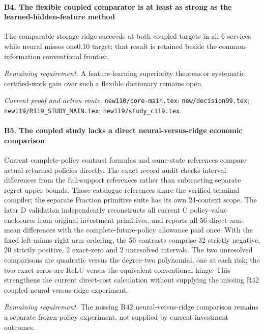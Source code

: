 \paragraph{B4. The flexible coupled comparator is at least as strong as the learned-hidden-feature method}

The comparable-storage ridge succeeds at both coupled targets in all 6 services while neural misses one0.10 target; that result is retained beside the common-information conventional frontier.

\par\emph{Remaining requirement.} A feature-learning superiority theorem or systematic certified-work gain over such a flexible dictionary remains open.

\par\emph{Current proof and action route.} \nolinkurl{new110/core-main.tex}; \nolinkurl{new/decision99.tex}; \nolinkurl{new119/R119_STUDY_MAIN.tex}; \nolinkurl{new119/study_c119.tex}.

\paragraph{B5. The coupled study lacks a direct neural-versus-ridge economic comparison}

Current complete-policy contrast formulas and same-state references compare actual returned policies directly. The exact record audit checks interval differences from the full-support references rather than subtracting separate regret upper bounds. Those catalogue references share the verified terminal compiler; the separate Fraction primitive suite has its own 24-context scope. The later D validation independently reconstructs all current C policy-value enclosures from original investment primitives, and reports all 56 direct arm-mean differences with the complete-future-policy allowance paid once. With the fixed left-minus-right arm ordering, the 56 contrasts comprise 32 strictly negative, 20 strictly positive, 2 exact-zero and 2 unresolved intervals. The two unresolved comparisons are quadratic versus the degree-two polynomial, one at each risk; the two exact zeros are ReLU versus the equivalent conventional hinge. This strengthens the current direct-cost calculation without supplying the missing R42 coupled neural-versus-ridge experiment.

\par\emph{Remaining requirement.} The missing R42 neural-versus-ridge comparison remains a separate frozen-policy experiment, not supplied by current investment outcomes.

